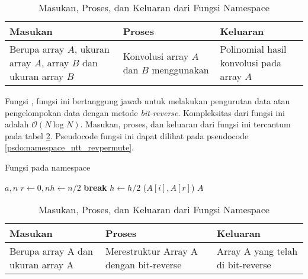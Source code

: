 \begin{table}[]	
	\Centering
	\begin{tabular}{|p{3cm}|p{3cm}|p{3cm}|}
	\hline
	Masukan & Proses & Keluaran \\ \hline
	Berupa array $A$, ukuran array $A$, array $B$ dan ukuran array $B$ & Konvolusi array $A$ dan $B$ menggunakan \fakesc{NTT} & Polinomial hasil konvolusi pada array $A$\\ \hline
	\end{tabular}
	\caption{Masukan, Proses, dan Keluaran dari Fungsi  Namespace }
	\label{tab:namespace_ntt_convolve}
\end{table}

\newpage

Fungsi , fungsi ini bertanggung jawab untuk melakukan pengurutan data atau pengelompokan data dengan metode \textit{bit-reverse}. Kompleksitas dari fungsi ini adalah $ \mathcal{O}{(N\ \text{log } N)}$. Masukan, proses, dan keluaran dari fungsi ini tercantum pada tabel \ref{tab:namespace_ntt_revpermute}. Pseudocode fungsi ini dapat dilihat pada pseudocode \ref{psdo:namespace_ntt_revpermute}.

\begin{algorithm}
	\caption{Fungsi  pada namespace }
	\label{psdo:namespace_ntt_revpermute}
	\begin{algorithmic}[1]
		\Require $ a, n $
		\State $ r \leftarrow 0, nh \leftarrow n / 2$
				 \State \textbf{break} \EndIf
			\EndFor
			\State $ h \leftarrow h / 2 $
				\State {}($ A[i], A[r]$) 
			\EndIf
		\EndFor
		\State \Return $ A $
	\end{algorithmic}
\end{algorithm}

\begin{table}[]	
	\Centering
	\begin{tabular}{|p{3cm}|p{3cm}|p{3cm}|}
	\hline
	Masukan & Proses & Keluaran \\ \hline
	Berupa array A dan ukuran array A & Merestruktur Array A dengan bit-reverse & Array A yang telah di bit-reverse\\ \hline
	\end{tabular}
	\caption{Masukan, Proses, dan Keluaran dari Fungsi  Namespace }
	\label{tab:namespace_ntt_revpermute}
\end{table}

